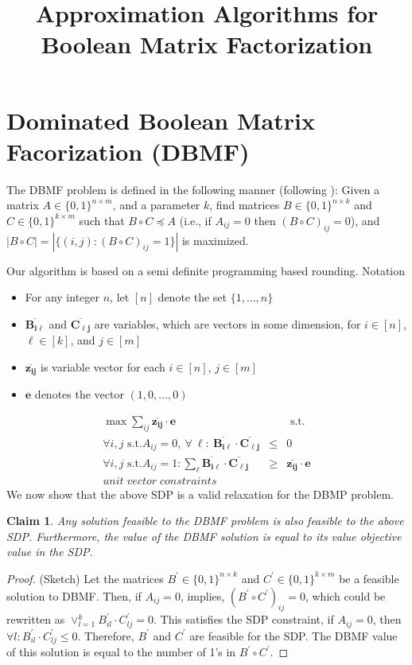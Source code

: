 \documentclass[11pt]{article}
\title{Approximation Algorithms for Boolean Matrix Factorization}
\newtheorem{claim}[lemma]{Claim} %
\begin{document}
%

\section{Dominated Boolean Matrix Facorization (DBMF)}

The DBMF problem is defined in the following manner (following \cite{miettinen:icdm10}):
Given a matrix $A\in\{0, 1\}^{n\times m}$, and a parameter $k$,
find matrices $B\in \{0, 1\}^{n\times k}$ and $C\in\{0, 1\}^{k\times m}$ such
that $B\circ C \preceq A$ (i.e., if $A_{ij}=0$ then $(B\circ C)_{ij}=0$),
and $|B\circ C| = |\{(i,j): (B\circ C)_{ij}=1\}|$ is maximized.

Our algorithm is based on a semi definite programming based rounding.
Notation
\begin{itemize}
\item
For any integer $n$, let $[n]$ denote the set $\{1,\ldots,n\}$
\item
$\overline{\mathbf{B_{i\ell}}}$ and $\overline{\mathbf{C_{\ell j}}}$ are variables,
which are vectors in some dimension, for $i\in[n]$, $\ell\in[k]$, and $j\in[m]$
\item
$\overline{\mathbf{z_{ij}}}$ is variable vector for each $i \in [n]$, $j\in[m]$
\item
$\mathbf{e}$ denotes the vector $(1, 0, \ldots, 0)$
\end{itemize}

\begin{eqnarray}
\max \sum_{ij} \overline{\mathbf{z_{ij}}}\cdot\mathbf{e} && \text{ s.t.}\\
\forall i,j \mbox{ s.t.} A_{ij}=0,\ \forall\ \ell:\ \overline{\mathbf{B_{i\ell}}}\cdot\overline{\mathbf{C_{\ell j}}} & \leq & 0\\
\forall i,j \mbox{ s.t.} A_{ij}=1: \sum_{\ell} \overline{\mathbf{B_{i\ell}}}\cdot\overline{\mathbf{C_{\ell j}}} &\geq& \overline{\mathbf{z_{ij}}}\cdot\mathbf{e} \\
unit \; vector \; constraints
\end{eqnarray}
We now show that the above SDP is a valid relaxation for the DBMP problem.
\begin{claim}
Any solution feasible to the DBMF problem is also feasible to the above SDP. Furthermore, the value of the DBMF solution is equal to its value objective value in the SDP. 
\end{claim}
\begin{proof} (Sketch)
Let the matrices $B^{'} \in \{0, 1\}^{n\times k}$ and $C^{'} \in\{0, 1\}^{k\times m}$ be a feasible solution to DBMF. Then, if $A_{ij} = 0$, implies, $(B^{'} \circ C^{'})_{ij}=0$, which could be rewritten as $\lor_{l=1}^k B_{il}^{'} \cdot C_{lj}^{'} = 0$.  This satisfies the SDP constraint, if $A_{ij} = 0$, then $\forall l: B_{il}^{'} \cdot C_{lj}^{'} \leq 0$. Therefore, $B^{'}$ and $C^{'}$ are feasible for the SDP.  The DBMF value of this solution is equal to the number of 1's in $B^{'} \circ C^{'}$. 
\end{proof}
\end{document}
